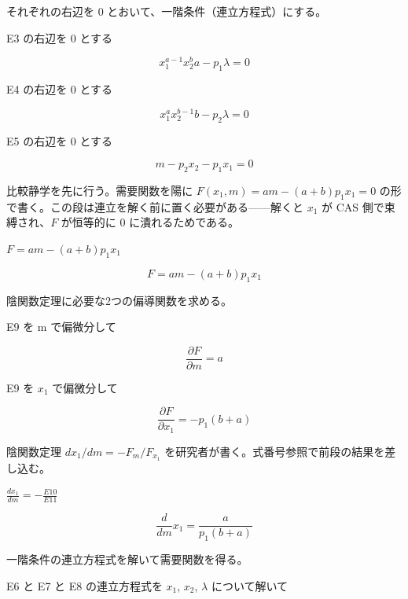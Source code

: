 \documentclass[dvipdfmx,a4paper,11pt]{jsarticle}
\begin{document}
それぞれの右辺を 0 とおいて、一階条件（連立方程式）にする。

E3 の右辺を 0 とする

\begin{equation}
  x_{1}^{a-1} x_{2}^{b} a-p_{1} \lambda = 0
  \label{eq:E6}
\end{equation}

E4 の右辺を 0 とする

\begin{equation}
  x_{1}^{a} x_{2}^{b-1} b-p_{2} \lambda = 0
  \label{eq:E7}
\end{equation}

E5 の右辺を 0 とする

\begin{equation}
  m-p_{2} x_{2}-p_{1} x_{1} = 0
  \label{eq:E8}
\end{equation}

比較静学を先に行う。需要関数を陽に $F(x_1,m)=am-(a+b)p_1x_1=0$ の形で書く。この段は連立を解く前に置く必要がある——解くと $x_1$ が CAS 側で束縛され、$F$ が恒等的に 0 に潰れるためである。

$F = a m - (a+b) p_1 x_1$

\begin{equation}
  F = a m - (a+b) p_1 x_1
  \label{eq:E9}
\end{equation}

陰関数定理に必要な2つの偏導関数を求める。

E9 を m で偏微分して

\begin{equation}
  \frac{\partial F}{\partial m} = a
  \label{eq:E10}
\end{equation}

E9 を $x_1$ で偏微分して

\begin{equation}
  \frac{\partial F}{\partial x_1} = -p_{1} \left(b+a\right)
  \label{eq:E11}
\end{equation}

陰関数定理 $dx_1/dm=-F_m/F_{x_1}$ を研究者が書く。式番号参照で前段の結果を差し込む。

$\frac{dx_1}{dm} = -\frac{E10}{E11}$

\begin{equation}
  \frac{d}{d m} x_{1}=\frac{a}{p_{1} \left(b+a\right)}
  \label{eq:E12}
\end{equation}

一階条件の連立方程式を解いて需要関数を得る。

E6 と E7 と E8 の連立方程式を $x_1$, $x_2$, $\lambda$ について解いて
\end{document}
